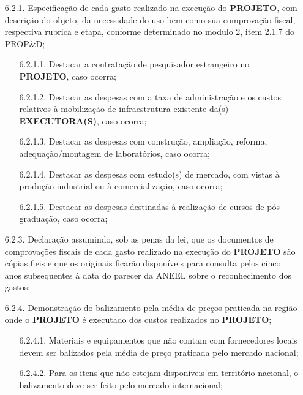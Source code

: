 {\begin{lmarginbox}
\begin{enumerate}[leftmargin=1cm, font=\bfseries]
\begin{enumerate}[font=\bfseries]
                \item[6.2.1.] Especificação de cada gasto realizado na execução do \textbf{PROJETO}, com descrição do objeto, da necessidade do uso bem como sua comprovação fiscal, respectiva rubrica e etapa, conforme determinado no modulo 2, item 2.1.7 do PROP\&D;
                    \begin{enumerate}[font=\bfseries]
                        \item[6.2.1.1.] Destacar a contratação de pesquisador estrangeiro no \textbf{PROJETO}, caso ocorra;
                        \item[6.2.1.2.]	Destacar as despesas com a taxa de administração e os custos relativos à mobilização de infraestrutura existente da(s) \textbf{EXECUTORA(S)}, caso ocorra;
                        \item[6.2.1.3.]	Destacar as despesas com construção, ampliação, reforma, adequação/montagem de laboratórios, caso ocorra;
                        \item[6.2.1.4.]	Destacar as despesas com estudo(s) de mercado, com vistas à produção industrial ou à comercialização, caso ocorra;
                        \item[6.2.1.5.]	Destacar as despesas destinadas à realização de cursos de pós-graduação, caso ocorra;
                    \end{enumerate}
                \item[6.2.3.]	Declaração assumindo, sob as penas da lei, que os documentos de comprovações fiscais de cada gasto realizado na execução do \textbf{PROJETO} são cópias fieis e que os originais ficarão disponíveis para consulta pelos cinco anos subsequentes à data do parecer da ANEEL sobre o reconhecimento dos gastos;
                \item[6.2.4.]	Demonstração do balizamento pela média de preços praticada na região onde o \textbf{PROJETO} é executado dos custos realizados no \textbf{PROJETO};
                    \begin{enumerate}[font=\bfseries]
                        \item[6.2.4.1.]	Materiais e equipamentos que não contam com fornecedores locais devem ser balizados pela média de preço praticada pelo mercado nacional;
                        \item[6.2.4.2.]	Para os itens que não estejam disponíveis em território nacional, o balizamento deve ser feito pelo mercado internacional;
                    \end{enumerate}
            \end{enumerate}



\end{enumerate}
\end{lmarginbox}}
